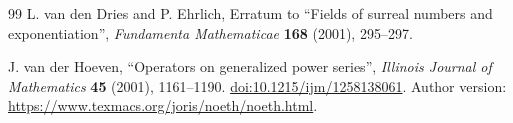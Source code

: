 \documentclass[11pt,a4paper]{article}
\numberwithin{equation}{section}
\theoremstyle{definition}
\theoremstyle{remark}
\theoremstyle{plain}
\begin{document}
\begin{thebibliography}{99}
L. van den Dries and P. Ehrlich, Erratum to ``Fields of surreal numbers and exponentiation'', \emph{Fundamenta Mathematicae} \textbf{168} (2001), 295--297.

J. van der Hoeven, ``Operators on generalized power series'', \emph{Illinois Journal of Mathematics} \textbf{45} (2001), 1161--1190. \href{https://doi.org/10.1215/ijm/1258138061}{doi:10.1215/ijm/1258138061}. Author version: \url{https://www.texmacs.org/joris/noeth/noeth.html}.

\end{thebibliography}
\end{document}
